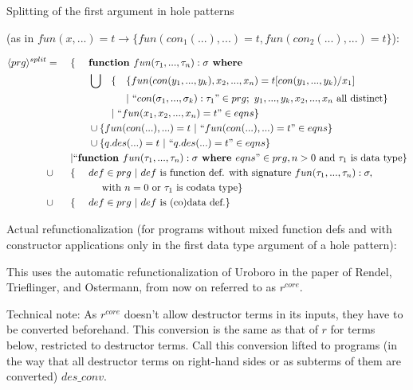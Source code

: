 \documentclass[11pt]{article} %
\begin{document}
Splitting of the first argument in hole patterns

(as in $fun(x,...) = t \rightarrow \{fun(con_1(...),...) = t, fun(con_2(...),...) = t\}$):

\begin{alignat*}{5}
\langle prg \rangle^{split} & = ~&& \{ ~&& \textrm{\textbf{function }} fun(\tau_1, ..., \tau_n): \sigma \textrm{\textbf{ where }} \span\span\span\span \\
& && && \bigcup && \{ && \{ fun(con(y_1, ..., y_k), x_2, ..., x_n) = t[con(y_1, ..., y_k)/x_1] \\
& && && && && | ~ `` con(\sigma_1, ..., \sigma_k): \tau_1 " \in prg; ~ y_1, ..., y_k, x_2, ..., x_n \textrm{ all distinct} \} \\
& && && && | ~ `` fun(x_1, x_2, ..., x_n) = t " \in eqns \} \span\span \\
& && && \cup \{ fun(con(...), ...) = t ~ | ~ `` fun(con(...), ...) = t " \in eqns \} \span\span\span\span \\
& && && \cup \{ q.des(...) = t ~ | ~ `` q.des(...) = t " \in eqns \} \span\span\span\span \\
& && | `` \textrm{\textbf{function }} fun(\tau_1, ..., \tau_n): \sigma \textrm{\textbf{ where }} eqns " \in prg, n > 0 \textrm{ and } \tau_1 \textrm{ is data type} \} \span\span\span\span\span\span \\
& \cup && \{ && def \in prg ~ | ~ def \textrm{ is function def. with signature } fun(\tau_1, ..., \tau_n): \sigma, \span\span\span\span \\
& && &&\quad \textrm{ with } n = 0 \textrm{ or } \tau_1 \textrm{ is codata type} \} \span\span\span\span \\
& \cup && \{ && def \in prg ~ | ~ def \textrm{ is (co)data def.} \} \span\span\span\span
\end{alignat*}

Actual refunctionalization (for programs without mixed function defs and with constructor applications only in the first data type argument of a hole pattern):

This uses the automatic refunctionalization of Uroboro in the paper of Rendel, Trieflinger, and Ostermann, from now on referred to as $r^{core}$.

Technical note: As $r^{core}$ doesn't allow destructor terms in its inputs, they have to be converted beforehand. This conversion is the same as that of $r$ for terms below, restricted to destructor terms. Call this conversion lifted to programs (in the way that all destructor terms on right-hand sides or as subterms of them are converted) $des\_conv$.
\end{document}
